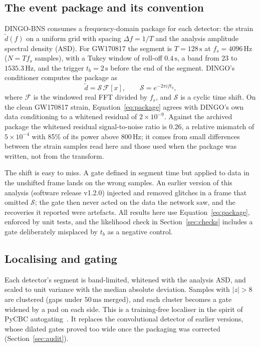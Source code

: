 \documentclass{openjournal}
\newcommand{\DINGOBNS}{DINGO-BNS\xspace}
\begin{document}
\subsection{The event package and its convention}
\label{sec:convention}

\DINGOBNS consumes a frequency-domain package for each detector: the strain $\tilde d(f)$ on a uniform grid with spacing $\Delta f = 1/T$ and the analysis amplitude spectral density (ASD).
For GW170817 the segment is $T=128\,\mathrm{s}$ at $f_s=4096\,\mathrm{Hz}$ ($N=T f_s$ samples), with a Tukey window of roll-off $0.4\,\mathrm{s}$, a band from $23$ to $1535.3\,\mathrm{Hz}$, and the trigger $t_b=2\,\mathrm{s}$ before the end of the segment.
DINGO's conditioner computes the package as
\begin{equation}
\tilde d = \mathcal{S}\,\mathcal{F}[x], \qquad \mathcal{S} = e^{-2\pi i f t_b},
\label{eq:package}
\end{equation}
where $\mathcal{F}$ is the windowed real FFT divided by $f_s$, and $\mathcal{S}$ is a cyclic time shift.
On the clean GW170817 strain, Equation~\eqref{eq:package} agrees with DINGO's own data conditioning to a whitened residual of $2\times10^{-9}$. Against the archived package the whitened residual signal-to-noise ratio is $0.26$, a relative mismatch of $5\times10^{-4}$ with 85\% of its power above $800\,\mathrm{Hz}$; it comes from small differences between the strain samples read here and those used when the package was written, not from the transform.

The shift is easy to miss.
A gate defined in segment time but applied to data in the unshifted frame lands on the wrong samples.
An earlier version of this analysis (software release v1.2.0) injected and removed glitches in a frame that omitted $\mathcal{S}$; the gate then never acted on the data the network saw, and the recoveries it reported were artefacts.
All results here use Equation~\eqref{eq:package}, enforced by unit tests, and the likelihood check in Section~\ref{sec:checks} includes a gate deliberately misplaced by $t_b$ as a negative control.

\subsection{Localising and gating}
\label{sec:gating}

Each detector's segment is band-limited, whitened with the analysis ASD, and scaled to unit variance with the median absolute deviation.
Samples with $|z|>8$ are clustered (gaps under $50\,\mathrm{ms}$ merged), and each cluster becomes a gate widened by a pad on each side.
This is a training-free localiser in the spirit of PyCBC autogating~\cite{Usman2016pycbc}.
It replaces the convolutional detector of earlier versions, whose dilated gates proved too wide once the packaging was corrected (Section~\ref{sec:audit}).
\end{document}
